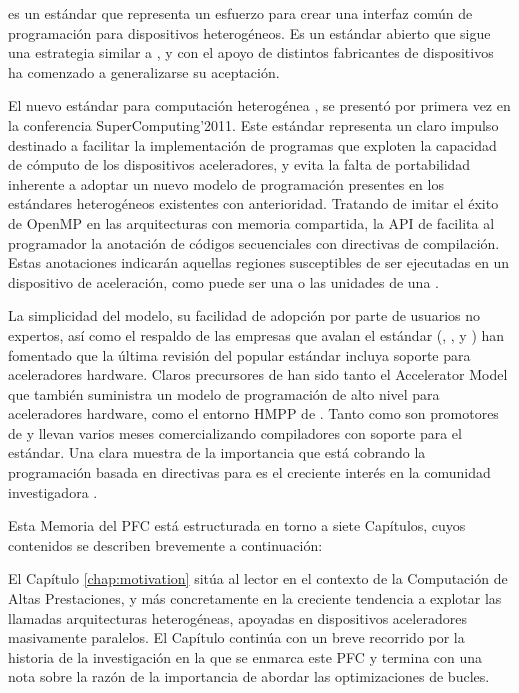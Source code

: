 \OpenCL{} \cite{OpenCL:2009:TOS} 
es un estándar que representa un esfuerzo para crear 
una interfaz común de programación para dispositivos heterogéneos. Es un estándar 
abierto que sigue una estrategia similar a \CUDA{}, y con el apoyo de distintos
fabricantes de dispositivos ha comenzado a generalizarse su aceptación.

El nuevo estándar para computación heterogénea \OpenACC{} \cite{URL::OpenACC}, se presentó
por primera vez en la conferencia SuperComputing'2011.
Este estándar representa un claro impulso destinado a facilitar la implementación de 
programas que 
exploten la capacidad de cómputo de los dispositivos aceleradores, y evita la falta de 
portabilidad inherente a adoptar un nuevo modelo de programación presentes en
los estándares heterogéneos existentes con anterioridad. Tratando de imitar el éxito de 
OpenMP en las arquitecturas \CPU{} con memoria compartida, 
la API de \OpenACC{} facilita al programador la anotación de códigos secuenciales 
con directivas de compilación. Estas anotaciones
indicarán aquellas regiones susceptibles de ser ejecutadas en un dispositivo de
aceleración, como puede ser una \GPU{} o las unidades \SIMD{} de una \CPU{}. 

La simplicidad del modelo, su facilidad de adopción por parte de usuarios no expertos, así 
como el respaldo de las empresas que avalan el 
estándar (\NVIDIA{}, \Cray{}, \PGI{} y \CAPS{}) han fomentado que la última revisión del 
popular estándar \OpenMP{} \cite{URL::OpenMP} incluya soporte para aceleradores hardware.
Claros precursores de \OpenACC{} han sido tanto el \PGI{} Accelerator Model 
\cite{Wolfe:2010:IPA} que también suministra un modelo de programación de 
alto nivel para aceleradores hardware, como el entorno HMPP 
\cite{Bodin:2009:HMP} de \CAPS{}. 
Tanto \PGI{} como \CAPS{} son promotores de \OpenACC{} y llevan varios meses 
comercializando compiladores con soporte para el estándar. Una clara muestra de la 
importancia que está cobrando la programación basada en directivas para \gpu{} es el
creciente interés en la comunidad investigadora \cite{Lee:2012:EED}.

Esta Memoria del \ac{PFC} está estructurada en torno a siete Capítulos, 
cuyos contenidos se describen brevemente a continuación:

El Capítulo \ref{chap:motivation} sitúa al lector en el contexto de la Computación de 
Altas Prestaciones, y más concretamente en la creciente tendencia a explotar las llamadas 
arquitecturas heterogéneas, apoyadas en dispositivos aceleradores masivamente paralelos. 
El Capítulo continúa con un breve recorrido por la historia de la investigación en la que 
se enmarca este \ac{PFC} y termina con una nota sobre la razón de la importancia de 
abordar las optimizaciones de bucles.

